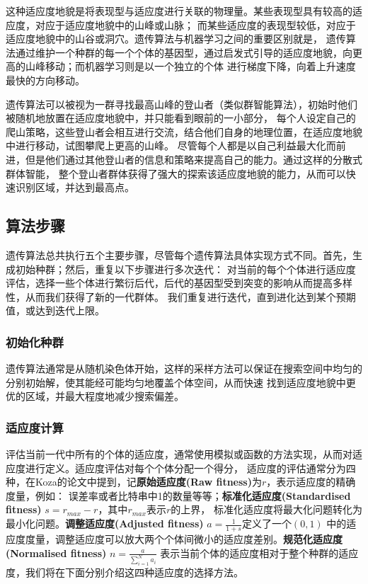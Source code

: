 \documentclass[12pt, a4paper, oneside]{ctexart}
\numberwithin{equation}{section}  %
\def\add{\vspace{1ex}}      %
\begin{document}
这种适应度地貌是将表现型与适应度进行关联的物理量。某些表现型具有较高的适应度，对应于适应度地貌中的山峰或山脉；
而某些适应度的表现型较低，对应于适应度地貌中的山谷或洞穴。遗传算法与机器学习之间的重要区别就是，
遗传算法通过维护一个种群的每一个个体的基因型，通过启发式引导的适应度地貌，向更高的山峰移动；而机器学习则是以一个独立的个体
进行梯度下降，向着上升速度最快的方向移动。

遗传算法可以被视为一群寻找最高山峰的登山者（类似群智能算法），初始时他们被随机地放置在适应度地貌中，并只能看到眼前的一小部分，
每个人设定自己的爬山策略，这些登山者会相互进行交流，结合他们自身的地理位置，在适应度地貌中进行移动，试图攀爬上更高的山峰。
尽管每个人都是以自己利益最大化而前进，但是他们通过其他登山者的信息和策略来提高自己的能力。通过这样的分散式群体智能，
整个登山者群体获得了强大的探索该适应度地貌的能力，从而可以快速识别区域，并达到最高点。
\subsection{算法步骤}
遗传算法总共执行五个主要步骤，尽管每个遗传算法具体实现方式不同。首先，生成初始种群；然后，重复以下步骤进行多次迭代：
对当前的每个个体进行适应度评估，选择一些个体进行繁衍后代，后代的基因型受到突变的影响从而提高多样性，从而我们获得了新的一代群体。
我们重复进行迭代，直到进化达到某个预期值，或达到迭代上限。
\subsubsection{初始化种群}
遗传算法通常是从随机染色体开始，这样的采样方法可以保证在搜索空间中均匀的分别初始解，使其能经可能均匀地覆盖个体空间，从而快速
找到适应度地貌中更优的区域\cite{bib-Mirjalili2019}，并最大程度地减少搜索偏差。
\subsubsection{适应度计算}
评估当前一代中所有的个体的适应度，通常使用模拟或函数的方法实现，从而对适应度进行定义。适应度评估对每个个体分配一个得分，
适应度的评估通常分为四种，在Koza的论文\cite{bib-Koza1992}中提到，记\textbf{原始适应度(Raw fitness)}为$r$，表示适应度的精确度量，例如：
误差率或者比特串中1的数量等等；\textbf{标准化适应度(Standardised fitness)} $s = r_{max}-r$，其中$r_{max}$表示$r$的上界，
\add 标准化适应度将最大化问题转化为最小化问题。\textbf{调整适应度(Adjusted fitness)} $a = \frac{1}{1+s}$\add 定义了一个$(0,1)$
中的适应度度量，调整适应度可以放大两个个体间微小的适应度差别。\textbf{规范化适应度(Normalised fitness)} $n = \frac{a}{\sum_{i=1}^Na_i}$\add
表示当前个体的适应度相对于整个种群的适应度，我们将在下面分别介绍这四种适应度的选择方法。
\end{document}
